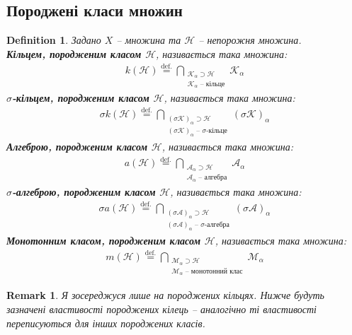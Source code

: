\documentclass[a4paper, 10pt]{article}
\theoremstyle{theoremdd}
\newtheorem{definition}[theorem]{Definition}
\newtheorem{remark}[theorem]{Remark}
\begin{document}
\subsection{Породжені класи множин}
\begin{definition}
Задано $X$ -- множина та $\mathcal{H}$ -- непорожня множина.\\
\textbf{Кільцем, породженим класом $\mathcal{H}$}, називається така множина:
\begin{align*}
k(\mathcal{H}) \overset{\text{def.}}{=} \bigcap_{\substack{\mathcal{K}_\alpha \supset \mathcal{H} \\ \mathcal{K}_\alpha \text{ -- кільце}}} \mathcal{K}_\alpha
\end{align*}
\textbf{$\sigma$-кільцем, породженим класом $\mathcal{H}$}, називається така множина:
\begin{align*}
\sigma k(\mathcal{H}) \overset{\text{def.}}{=} \bigcap_{\substack{(\sigma\mathcal{K})_\alpha \supset \mathcal{H} \\ (\sigma\mathcal{K})_\alpha \text{ -- $\sigma$-кільце}}} (\sigma\mathcal{K})_\alpha
\end{align*}
\textbf{Алгеброю, породженим класом $\mathcal{H}$}, називається така множина:
\begin{align*}
a(\mathcal{H}) \overset{\text{def.}}{=} \bigcap_{\substack{\mathcal{A}_\alpha \supset \mathcal{H} \\ \mathcal{A}_\alpha \text{ -- алгебра}}} \mathcal{A}_\alpha
\end{align*}
\textbf{$\sigma$-алгеброю, породженим класом $\mathcal{H}$}, називається така множина:
\begin{align*}
\sigma a(\mathcal{H}) \overset{\text{def.}}{=} \bigcap_{\substack{(\sigma\mathcal{A})_\alpha \supset \mathcal{H} \\ (\sigma\mathcal{A})_\alpha \text{ -- $\sigma$-алгебра}}} (\sigma\mathcal{A})_\alpha
\end{align*}
\textbf{Монотонним класом, породженим класом $\mathcal{H}$}, називається така множина:
\begin{align*}
m(\mathcal{H}) \overset{\text{def.}}{=} \bigcap_{\substack{\mathcal{M}_\alpha \supset \mathcal{H} \\ \mathcal{M}_\alpha \text{ -- монотонний клас}}} \mathcal{M}_\alpha
\end{align*}
\end{definition}

\begin{remark}
Я зосереджуся лише на породжених кільцях. Нижче будуть зазначені властивості породжених кілець -- аналогічно ті властивості переписуються для інших породжених класів.
\end{remark}
\end{document}
